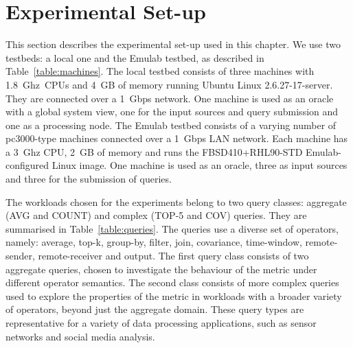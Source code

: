 \section{Experimental Set-up}

This section describes the experimental set-up used in this chapter. We use two testbeds: a local one and
the Emulab testbed, as described in Table~\ref{table:machines}. The local testbed consists of three
machines with 1.8~Ghz~CPUs and 4~GB of memory running Ubuntu Linux 2.6.27-17-server. They are connected
over a 1~Gbps network.
One machine is used as an oracle with a global system view, one for the input sources and query
submission and one as a processing node.
The Emulab testbed consists of a varying number of pc3000-type machines connected over a 1~Gbps LAN network. 
Each machine has a 3~Ghz CPU, 2~GB of memory and runs the FBSD410+RHL90-STD Emulab-configured Linux
image. One machine is used as an oracle, three as input sources and three for the submission of queries.
 
The workloads chosen for the experiments belong to two query classes:  
aggregate (\ie \textnormal{AVG}
and \textnormal{COUNT}) and complex (\ie \textnormal{TOP-5} and 
\textnormal{COV}) queries. They are summarised in Table~\ref{table:queries}. 
The queries use a diverse set of operators, namely: \textnormal{average}, 
\textnormal{top-k}, \textnormal{group-by}, \textnormal{filter}, \textnormal{join}, \textnormal{covariance}, 
\textnormal{time-window}, \textnormal{remote-sender}, \textnormal{remote-receiver} 
and \textnormal{output}. The first query class consists of two aggregate queries, chosen to
investigate the behaviour of the \sic metric under different operator semantics. 
The second class consists of more complex queries used to explore the properties of the \sic metric in
workloads with a broader variety of operators, beyond just the aggregate domain.
These query types are representative for a variety of data processing applications, such as sensor
networks and social media analysis.\\




